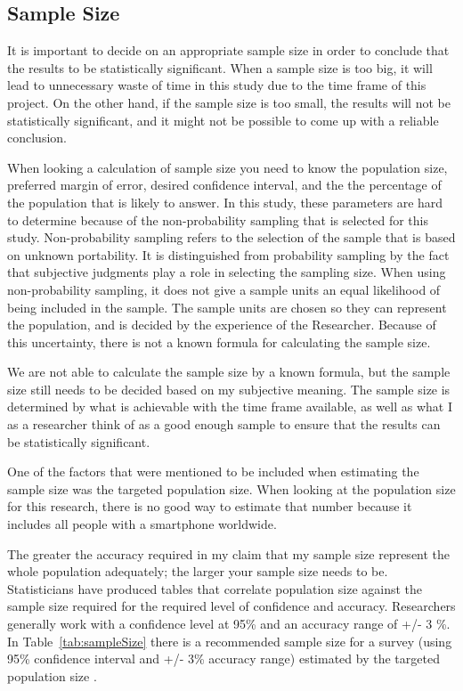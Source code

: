    \subsection{Sample Size} \label{sec:samplesize}

    It is important to decide on an appropriate sample size in order to conclude that the results to be statistically significant. When a sample size is too big, it will lead to unnecessary waste of time in this study due to the time frame of this project. On the other hand, if the sample size is too small, the results will not be statistically significant, and it might not be possible to come up with a reliable conclusion. 

    When looking a calculation of sample size you need to know the population size, preferred margin of error, desired confidence interval, and the the percentage of the population that is likely to answer. In this study, these parameters are hard to determine because of the non-probability sampling that is selected for this study. Non-probability sampling refers to the selection of the sample that is based on unknown portability. It is distinguished from probability sampling by the fact that subjective judgments play a role in selecting the sampling size. When using non-probability sampling, it does not give a sample units an equal likelihood of being included in the sample. The sample units are chosen so they can represent the population, and is decided by the experience of the Researcher. Because of this uncertainty, there is not a known formula for calculating the sample size. 

    We are not able to calculate the sample size by a known formula, but the sample size still needs to be decided based on my subjective meaning. The sample size is determined by what is achievable with the time frame available, as well as what I as a researcher think of as a good enough sample to ensure that the results can be statistically significant. 

    One of the factors that were mentioned to be included when estimating the sample size was the targeted population size. When looking at the population size for this research, there is no good way to estimate that number because it includes all people with a smartphone worldwide. 

    The greater the accuracy required in my claim that my sample size represent the whole population adequately; the larger your sample size needs to be. Statisticians have produced tables that correlate population size against the sample size required for the required level of confidence and accuracy. Researchers generally work with a confidence level at 95\% and an accuracy range of +/- 3 \%. In Table~\ref{tab:sampleSize} there is a recommended sample size for a survey (using 95\% confidence interval and +/- 3\% accuracy range) estimated by the targeted population size \cite{empiriske}.  

